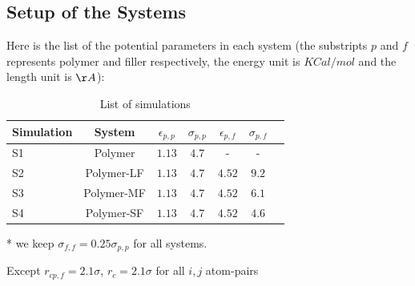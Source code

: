 \subsection*{Setup of the Systems}
Here is the list of the potential parameters in each system (the substripts $p$ and $f$ represents polymer and filler respectively, the energy unit is $KCal/mol$ and the length unit is $\AA$):
\begin{table}[h!]
\begin{center}
\vspace*{0.5cm}
\begin{threeparttable}
\begin{tabular}{lcccccc}
\hline
Simulation & System & $\epsilon_{p,p}$ & $\sigma_{p,p}$ & $\epsilon_{p,f}$\tnote{*} & $\sigma_{p,f}$\tnote{\dag}\\
\hline
S1 & Polymer     & $1.13$         & $4.7$ &    -    & -     \\
S2 & Polymer-LF  & $1.13$         & $4.7$ & $4.52$  & $9.2$ \\
S3 & Polymer-MF  & $1.13$\tnote{*}& $4.7$ & $4.52$  & $6.1$ \\
S4 & Polymer-SF  & $1.13$         & $4.7$ & $4.52$  & $4.6$ \\
\hline
\end{tabular}
\begin{tablenotes}
\item[*] \small{we keep $\sigma_{f,f}=0.25\sigma_{p,p}$ for all systems.}
\item[\dag] \small{Except $r_{cp,f}=2.1\sigma$, $r_{c}=2.1\sigma$ for all $i,j$ atom-pairs}
\end{tablenotes}
\end{threeparttable}
\caption{List of simulations}
\label{simu_summary}
\end{center}
\end{table}

